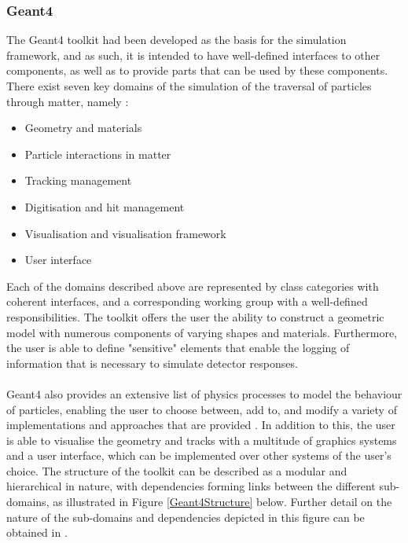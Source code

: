 \subsubsection{Geant4}\label{Geant4}
The Geant4 toolkit had been developed as the basis for the simulation framework, and as such, it is intended to have well-defined interfaces to other components, as well as to provide parts that can be used by these components. 
There exist seven key domains of the simulation of the traversal of particles through matter, namely \cite{GEANT4:2002zbu}:
\begin{itemize}
    \item Geometry and materials
    \item Particle interactions in matter
    \item Tracking management
    \item Digitisation and hit management
    \item Visualisation and visualisation framework
    \item User interface
\end{itemize}
Each of the domains described above are represented by class categories with coherent interfaces, and a corresponding working group with a well-defined responsibilities. The toolkit offers the user the ability to construct a geometric model 
with numerous components of varying shapes and materials. Furthermore, the user is able to define "sensitive" elements that enable the logging of information that is necessary to simulate detector responses.\\
\\
Geant4 also provides an extensive list of physics processes to model the behaviour of particles, enabling the user to choose between, add to, and modify a variety of implementations and approaches that are provided \cite{GEANT4:2002zbu}. In addition to this, the user is able to visualise the geometry
and tracks with a multitude of graphics systems and a user interface, which can be implemented over other systems of the user's choice. The structure of the toolkit can be described as a modular and hierarchical in nature, with dependencies forming links between the different sub-domains,
as illustrated in Figure \ref{Geant4Structure} below. Further detail on the nature of the sub-domains and dependencies depicted in this figure can be obtained in \cite{GEANT4:2002zbu}.
